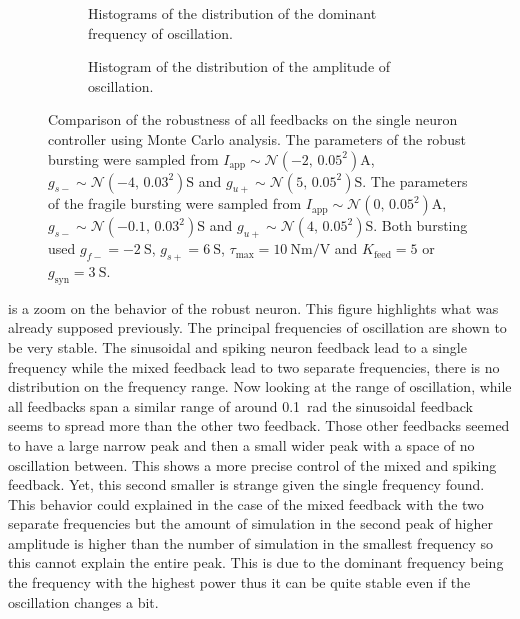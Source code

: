 \begin{figure}[!htbp]
    \centering
    \begin{subfigure}[t][.43\textheight][b]{\textwidth}
        \centering
        \caption{Histograms of the distribution of the dominant frequency of oscillation.}
        \label{fig:single_monte_freq}
    \end{subfigure}
    
    \begin{subfigure}[b][.43\textheight][t]{\textwidth}
        \centering
        \caption{Histogram of the distribution of the amplitude of oscillation.}
        \label{fig:single_monte_range}
    \end{subfigure}
    \caption{Comparison of the robustness of all feedbacks on the single neuron controller using Monte Carlo analysis. The parameters of the robust bursting were sampled from $I_\text{app} \sim \mathcal{N}\left(-2,\, 0.05^2\right) \unit{\ampere}$, $g_{s-} \sim \mathcal{N}\left(-4,\, 0.03^2\right) \unit{\siemens}$ and $g_{u+} \sim \mathcal{N}\left(5,\, 0.05^2\right) \unit{\siemens}$. The parameters of the fragile bursting were sampled from $I_\text{app} \sim \mathcal{N}\left(0,\, 0.05^2\right) \unit{\ampere}$, $g_{s-} \sim \mathcal{N}\left(-0.1,\, 0.03^2\right) \unit{\siemens}$ and $g_{u+} \sim \mathcal{N}\left(4,\, 0.05^2\right) \unit{\siemens}$. Both bursting used $g_{f-} = \qty{-2}{\siemens}$, $g_{s+} = \qty{6}{\siemens}$, $\tau_\text{max} = \qty{10}{\newton\meter\per\volt}$ and $K_\text{feed} = 5$ or $g_{\text{syn}} = \qty{3}{\siemens}$.}
    \label{fig:single_monte}
\end{figure}

 is a zoom on the behavior of the robust neuron. 
This figure highlights what was already supposed previously. The principal frequencies of oscillation are shown to be very stable. 
The sinusoidal and spiking neuron feedback lead to a single frequency while the mixed feedback lead to two separate frequencies, there is no distribution on the frequency range.
Now looking at the range of oscillation, while all feedbacks span a similar range of around \qty{0.1}{\radian} the sinusoidal feedback seems to spread more than the other two feedback.
Those other feedbacks seemed to have a large narrow peak and then a small wider peak with a space of no oscillation between. 
This shows a more precise control of the mixed and spiking feedback. 
Yet, this second smaller is strange given the single frequency found.
This behavior could explained in the case of the mixed feedback with the two separate frequencies but the amount of simulation in the second peak of higher amplitude is higher than the number of simulation in the smallest frequency so this cannot explain the entire peak.
This is due to the dominant frequency being the frequency with the highest power thus it can be quite stable even if the oscillation changes a bit.

